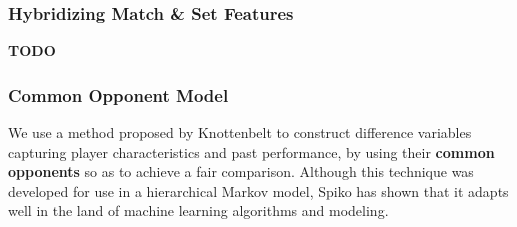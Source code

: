 \documentclass[paper=a4, fontsize=11pt]{scrartcl} %
\numberwithin{equation}{section} %
\numberwithin{figure}{section} %
\numberwithin{table}{section} %
\begin{document}
\subsubsection{Hybridizing Match \& Set Features}
\textbf{TODO}
\subsubsection{Common Opponent Model}
We use a method proposed by Knottenbelt \cite{KNOTTENBELT20123820} to construct difference variables capturing player characteristics and past performance, by using their \textbf{common opponents} so as to achieve a fair comparison. Although this technique was developed for use in a hierarchical Markov model, Spiko \cite{tennis1} has shown that it adapts well in the land of machine learning algorithms and modeling. 
\end{document}
